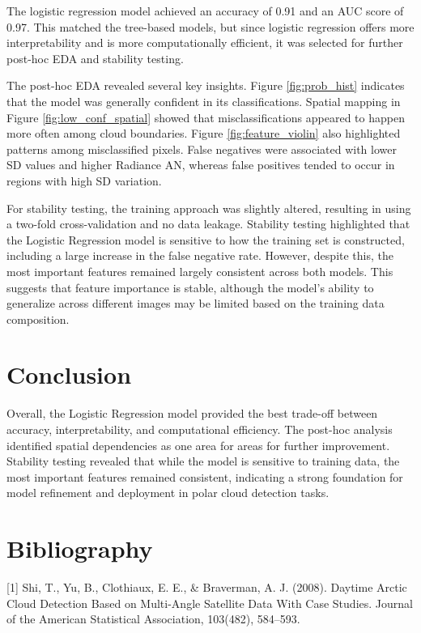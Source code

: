 \documentclass[11pt,letterpaper]{article}
\begin{document}
The logistic regression model achieved an accuracy of 0.91 and an AUC score of 0.97. This matched the tree-based models, but since logistic regression offers more interpretability and is more computationally efficient, it was selected for further post-hoc EDA and stability testing.

The post-hoc EDA revealed several key insights. Figure \ref{fig:prob_hist} indicates that the model was generally confident in its classifications. Spatial mapping in Figure \ref{fig:low_conf_spatial} showed that misclassifications appeared to happen more often among cloud boundaries. Figure \ref{fig:feature_violin} also highlighted patterns among misclassified pixels. False negatives were associated with lower SD values and higher Radiance AN, whereas false positives tended to occur in regions with high SD variation.

For stability testing, the training approach was slightly altered, resulting in using a two-fold cross-validation and no data leakage. Stability testing highlighted that the Logistic Regression model is sensitive to how the training set is constructed, including a large increase in the false negative rate. However, despite this, the most important features remained largely consistent across both models. This suggests that feature importance is stable, although the model's ability to generalize across different images may be limited based on the training data composition. 
\vspace{1em} %
\section{Conclusion}
\vspace{0.5em} %
Overall, the Logistic Regression model provided the best trade-off between accuracy, interpretability, and computational efficiency. The post-hoc analysis identified spatial dependencies as one area for areas for further improvement. Stability testing revealed that while the model is sensitive to training data, the most important features remained consistent, indicating a strong foundation for model refinement and deployment in polar cloud detection tasks.
\newpage
\sloppy
\section{Bibliography}

[1] Shi, T., Yu, B., Clothiaux, E. E., \& Braverman, A. J. (2008). Daytime Arctic Cloud Detection Based on Multi-Angle Satellite Data With Case Studies. Journal of the American Statistical Association, 103(482), 584–593.
\end{document}

